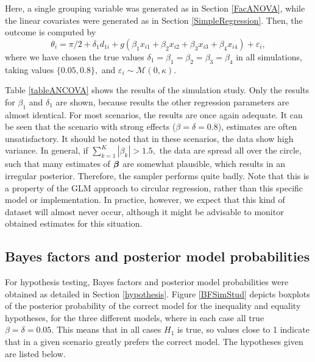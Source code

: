 Here, a single grouping variable was generated as in Section \ref{FacANOVA}, while the linear covariates were generated as in Section \ref{SimpleRegression}. Then, the outcome is computed by
\begin{equation}
\theta_i = \pi/2 + \delta_1 d_{1i} + g(\beta_1 x_{i1} + \beta_2 x_{i2} + \beta_3 x_{i3} + \beta_4 x_{i4}) + \varepsilon_i,
\end{equation}
where we have chosen the true values \( \delta_1 = \beta_1 = \beta_2 = \beta_3 = \beta_4 \) in all simulations, taking values \( \{ 0.05, 0.8 \},\) and \( \varepsilon_i \sim \mathcal{M}(0, \kappa).\)

Table \ref{tableANCOVA} shows the results of the simulation study. Only the results for \( \beta_1 \) and \( \delta_1 \) are shown, because results the other regression parameters are almost identical. For most scenarios, the results are once again adequate. It can be seen that the scenario with strong effects (\( \beta = \delta = 0.8\)), estimates are often unsatisfactory. It should be noted that in these scenarios, the data show high variance. In general, if \( \sum_{k=1}^K | \beta_k | > 1.5, \) the data are spread all over the circle, such that many estimates of \( \boldsymbol{\beta} \) are somewhat plausible, which results in an irregular posterior. Therefore, the sampler performs quite badly. Note that this is a property of the GLM approach to circular regression, rather than this specific model or implementation. In practice, however, we expect that this kind of dataset will almost never occur, although it might be advisable to monitor obtained estimates for this situation.


\subsection{Bayes factors and posterior model probabilities}



For hypothesis testing, Bayes factors and posterior model probabilities were obtained as detailed in Section \ref{hypothesis}. Figure \ref{BFSimStud} depicts boxplots of the posterior probability of the correct model for the inequality and equality hypotheses, for the three different models, where in each case all true \( \beta = \delta = 0.05 \). This means that in all cases \( H_1 \) is true, so values close to 1 indicate that in a given scenario greatly prefers the correct model. The hypotheses given are listed below.


